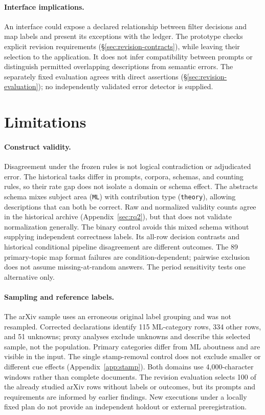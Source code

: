 \documentclass[11pt]{article}
\begin{document}
\paragraph{Interface implications.}
An interface could expose a declared relationship between filter decisions and
map labels and present its exceptions with the ledger. The prototype checks
explicit revision requirements (\S\ref{sec:revision-contracts}), while leaving
their selection to the application. It does not infer compatibility between
prompts or distinguish permitted overlapping descriptions from semantic
errors. The separately fixed evaluation agrees with direct assertions
(\S\ref{sec:revision-evaluation}); no independently validated error detector
is supplied.

\section{Limitations}

\paragraph{Construct validity.}
Disagreement under the frozen rules is not logical contradiction or
adjudicated error. The historical tasks differ in prompts, corpora, schemas,
and counting rules, so their rate gap does not isolate a domain or schema
effect. The abstracts schema mixes subject area (\texttt{ML}) with contribution
type (\texttt{theory}), allowing descriptions that can both be correct.
Raw and normalized validity counts agree in the historical archive
(Appendix~\ref{sec:rq2}), but that does not validate normalization generally.
The binary control avoids this mixed schema without supplying independent
correctness labels. Its all-row decision contrasts and historical conditional
pipeline disagreement are different outcomes. The 89 primary-topic map
format failures are condition-dependent; pairwise exclusion does not assume
missing-at-random answers. The period sensitivity tests one alternative only.

\paragraph{Sampling and reference labels.}
The arXiv sample uses an erroneous original label grouping and was not
resampled. Corrected declarations identify 115 ML-category rows, 334 other
rows, and 51 unknowns; proxy analyses exclude unknowns and describe this
selected sample, not the population. Primary categories differ from ML
aboutness and are visible in the input. The single stamp-removal control
does not exclude smaller or different cue effects (Appendix~\ref{app:stamp}).
Both domains use 4,000-character windows rather than complete documents.
The revision evaluation selects 100 of the already studied arXiv rows without
labels or outcomes, but its prompts and requirements are informed by earlier
findings. New executions under a locally fixed plan do not provide an
independent holdout or external preregistration.
\end{document}
